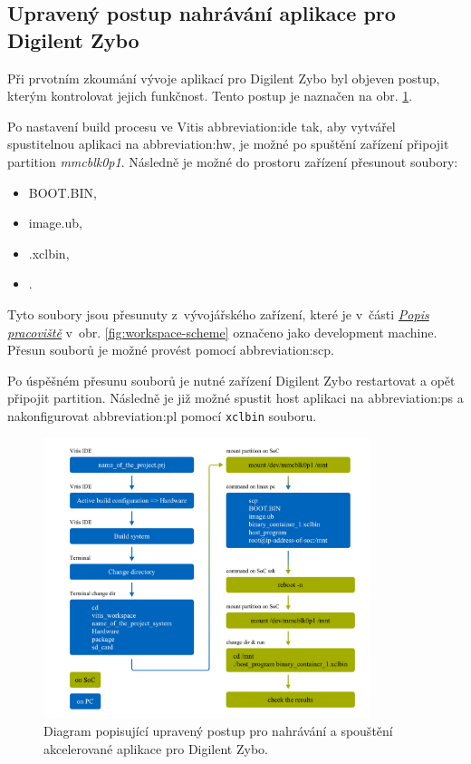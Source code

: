 \documentclass[a4paper, twoside, 11pt]{article}
\begin{document}
\begin{appendices}
	\section{Upravený postup nahrávání aplikace pro Digilent Zybo}
	Při prvotním zkoumání vývoje aplikací pro Digilent Zybo byl objeven postup, kterým kontrolovat jejich funkčnost. Tento postup je naznačen na obr. \ref{fig:vitis-edited-debugging-flow}.\par
	Po nastavení build procesu ve Vitis \gls{abbreviation:ide} tak, aby vytvářel spustitelnou aplikaci na \gls{abbreviation:hw}, je možné po spuštění zařízení připojit partition \textit{mmcblk0p1}. Následně je možné do prostoru zařízení přesunout soubory:
	\begin{itemize}
		\item BOOT.BIN,
		\item image.ub,
		\item <binary-container-name>.xclbin,
		\item <host-program-name>.
	\end{itemize}
	Tyto soubory jsou přesunuty z~vývojářského zařízení, které je v~části \hyperref[sec:popis-pracoviste]{\textit{Popis pracoviště}} v~obr. \ref{fig:workspace-scheme} označeno jako \textcolor{ctuorange}{development machine}. Přesun souborů je možné provést pomocí \gls{abbreviation:scp}.\par
	Po úspěšném přesunu souborů je nutné zařízení Digilent Zybo restartovat a opět připojit partition. Následně je již možné spustit host aplikaci na \gls{abbreviation:ps} a nakonfigurovat \gls{abbreviation:pl} pomocí \texttt{xclbin} souboru.
	\begin{figure}[htbp!]
		\centering
		\includegraphics[width=0.85\textwidth]{src/pdf/vitis-edited-debugging-flow.pdf}
		\caption{Diagram popisující upravený postup pro nahrávání a spouštění akcelerované aplikace pro Digilent Zybo.}
		\label{fig:vitis-edited-debugging-flow}
	\end{figure}


\end{appendices}
\end{document}
